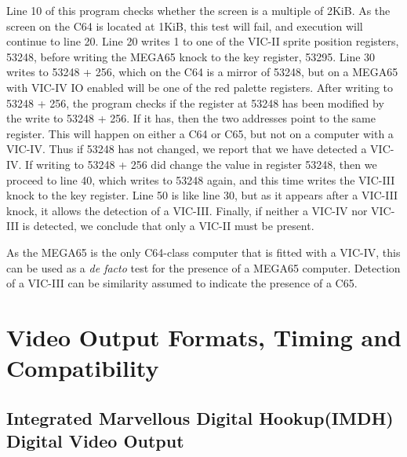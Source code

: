 
Line 10 of this program checks whether the screen is a multiple of 2KiB.
As the screen on the C64 is located at 1KiB, this test will fail, and execution
will continue to line 20.  Line 20 writes 1 to one of the VIC-II sprite position
registers, 53248, before writing the MEGA65 knock to the key register, 53295.
Line 30 writes to 53248 + 256, which on the C64 is a mirror of 53248, but on a
MEGA65 with VIC-IV IO enabled will be one of the red palette registers.
After writing to 53248 + 256, the program checks if the register at 53248 has
been modified by the write to 53248 + 256.  If it has, then the two addresses
point to the same register.  This will happen on either a C64 or C65, but not on
a computer with a VIC-IV.  Thus if 53248 has not changed, we report that we have detected a VIC-IV.
If writing to 53248 + 256 did change the value in register 53248, then we proceed
to line 40, which writes to 53248 again, and this time writes the VIC-III knock to
the key register.  Line 50 is like line 30, but as it appears after a VIC-III knock,
it allows the detection of a VIC-III.  Finally, if neither a VIC-IV nor VIC-III
is detected, we conclude that only a VIC-II must be present.

As the MEGA65 is the only C64-class computer that is fitted with a
VIC-IV, this can be used as a {\em de facto} test for the presence of
a MEGA65 computer. Detection of a VIC-III can be similarity assumed to
indicate the presence of a C65.

\section{Video Output Formats, Timing and Compatibility}

\subsection{Integrated Marvellous Digital Hookup\texttrademark (IMDH\texttrademark)
  Digital Video Output}

